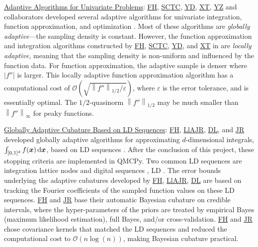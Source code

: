\documentclass[11pt]{NSFamsart}
\newcommand{\Upara}[1]{\noindent\underline{#1}:\xspace}
\newcommand{\FH}{\hyperlink{FHlink}{FH}\xspace}
\newcommand{\SCTC}{\hyperlink{SCTClink}{SCTC}\xspace}
\newcommand{\YD}{\hyperlink{YDlink}{YD}\xspace}
\newcommand{\JR}{\hyperlink{JRlink}{JR}\xspace}
\newcommand{\LlAJR}{\hyperlink{LlAJRlink}{LlAJR}\xspace}
\newcommand{\XT}{\hyperlink{XTlink}{XT}\xspace}
\newcommand{\DL}{\hyperlink{DLlink}{DL}\xspace}
\newcommand{\YZ}{\hyperlink{YZlink}{YZ}\xspace}
\newcommand{\bx}{{\boldsymbol{x}}}
\def\dif{\textup{d}}
\def\abs#1{\ensuremath{\left \lvert #1 \right \rvert}}
\newcommand{\norm}[2][{}]{\ensuremath{\left \lVert #2 \right \rVert}_{#1}}
\newcommand{\Order}{\mathcal{O}}
\begin{document}

\Upara{Adaptive Algorithms for Univariate Problems}
\FH, \SCTC, \YD, \XT, \YZ and collaborators developed several adaptive algorithms for univariate integration, function approximation, and optimization \cite{ChoEtal17a,HicEtal14b,  Din15a, Ton14a, Zha18a}.  Most of these algorithms are \emph{globally adaptive}---the sampling density is constant. However, the function approximation and integration algorithms constructed by \FH, \SCTC, \YD, and \XT in \cite{ChoEtal17a} are \emph{locally adaptive}, meaning that the sampling density is non-uniform and influenced by the function data.  For function approximation, the adaptive sample is denser where $\abs{f''}$ is larger.  This locally adaptive function approximation algorithm has a computational cost of $\Order\left(\sqrt{\norm[1/2]{f''}/\varepsilon} \right)$, where $\varepsilon$ is the error tolerance, and is essentially optimal.  The $1/2$-quasinorm $\norm[1/2]{f''}$ may be much smaller than 
$\norm[\infty]{f''}$ for peaky functions.


\Upara{Globally Adaptive Cubature Based on LD Sequences}
\FH, \LlAJR, \DL, and \JR developed globally adaptive algorithms for approximating $d$-dimensional integrals,  $\int_{[0,1]^d} f(\bx) \, \dif \bx$, based on LD sequences \cite{HicJim16a,HicEtal17a,JimHic16a}.  After the conclusion of this project, these stopping criteria are implemented in QMCPy. Two common LD sequences are integration lattice nodes and digital sequences \cite{DicEtal14a}, LD .  The error bounds underlying the adaptive cubatures developed by \FH, \LlAJR, \DL are based on tracking the  Fourier coefficients of the sampled function values on these LD sequences.  \FH and \JR base their automatic Bayesian cubature on credible intervals, where the hyper-parameters of the priors are treated by empirical Bayes (maximum likelihood estimation), full Bayes, and/or cross-validation.   \FH and \JR chose covariance kernels that matched the LD sequences and reduced the computational cost to $\Order(n \log(n))$, making Bayesian cubature practical. 
\end{document}
